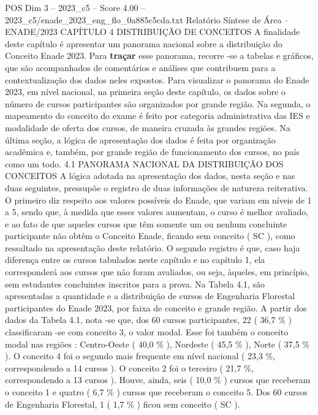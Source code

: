 \begin{textsample}{POS Dim 3 – 2023\_c5 – Score 4.00 – 2023\_c5/enade\_2023\_eng\_flo\_0a885c5cda.txt}  \label{ex:f3_pos_056}
Relatório Síntese de Área – ENADE/2023 CAPÍTULO 4 DISTRIBUIÇÃO DE CONCEITOS A finalidade deste capítulo é apresentar um panorama nacional sobre a distribuição do Conceito Enade 2023.
Para \textbf{traçar} esse panorama, recorre -se a tabelas e gráficos, que são acompanhados de comentários e análises que contribuem para a contextualização dos dados neles expostos.
Para visualizar o panorama do Enade 2023, em nível nacional, na primeira seção deste capítulo, os dados sobre o número de cursos participantes são organizados por grande região.
Na segunda, o mapeamento do conceito do exame é feito por categoria administrativa das IES e modalidade de oferta dos cursos, de maneira cruzada às grandes regiões.
Na última seção, a lógica de apresentação dos dados é feita por organização acadêmica e, também, por grande região de funcionamento dos cursos, no país como um todo. 4.1 PANORAMA NACIONAL DA DISTRIBUIÇÃO DOS CONCEITOS A lógica adotada na apresentação dos dados, nesta seção e nas duas seguintes, pressupõe o registro de duas informações de natureza reiterativa.
O primeiro diz respeito aos valores possíveis do Enade, que variam em níveis de 1 a 5, sendo que, à medida que esses valores aumentam, o curso é melhor avaliado, e ao fato de que aqueles cursos que têm somente um ou nenhum concluinte participante não obtêm o Conceito Enade, ficando sem conceito ( SC ), como ressaltado na apresentação deste relatório.
O segundo registro é que, caso haja diferença entre os cursos tabulados neste capítulo e no capítulo 1, ela corresponderá aos cursos que não foram avaliados, ou seja, àqueles, em princípio, sem estudantes concluintes inscritos para a prova.
Na Tabela 4.1, são apresentadas a quantidade e a distribuição de cursos de Engenharia Florestal participantes do Enade 2023, por faixa de conceito e grande região.
A partir dos dados da Tabela 4.1, nota -se que, dos 60 cursos participantes, 22 ( 36,7 \% ) classificaram -se com conceito 3, o valor modal.
Esse foi também o conceito modal nas regiões : Centro-Oeste ( 40,0 \% ), Nordeste ( 45,5 \% ), Norte ( 37,5 \% ).
O conceito 4 foi o segundo mais frequente em nível nacional ( 23,3 \%, correspondendo a 14 cursos ).
O conceito 2 foi o terceiro ( 21,7 \%, correspondendo a 13 cursos ).
Houve, ainda, seis ( 10,0 \% ) cursos que receberam o conceito 1 e quatro ( 6,7 \% ) cursos que receberam o conceito 5.
Dos 60 cursos de Engenharia Florestal, 1 ( 1,7 \% ) ficou sem conceito ( SC ).

\end{textsample}
